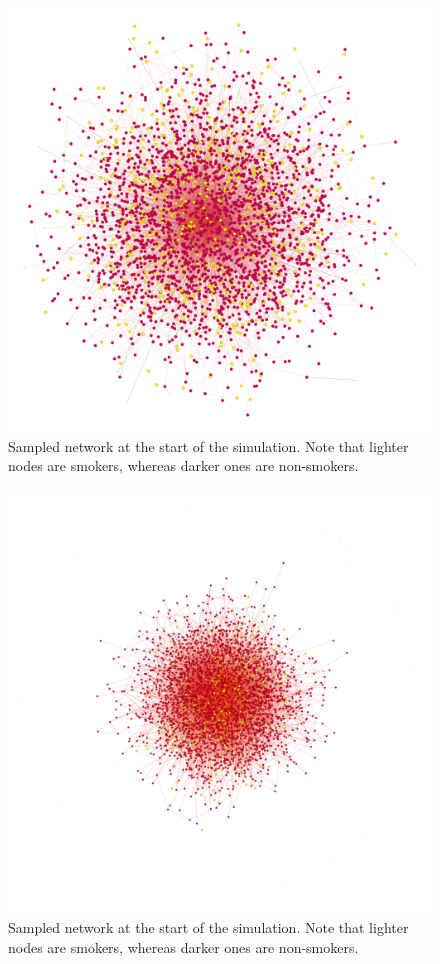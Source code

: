 \documentclass[]{report}
\begin{document}
\begin{figure}
\label{img:sample-init}
\begin{center}
\includegraphics[scale=0.4]{sample-init.png}
\end{center}
\caption{Sampled network at the start of the simulation. Note that lighter nodes are smokers, whereas darker ones are non-smokers.}
\end{figure}
\begin{figure}
\label{img:sample-fin}
\begin{center}
\includegraphics[scale=0.5]{sample-fin.png}
\end{center}
\caption{Sampled network at the start of the simulation. Note that lighter nodes are smokers, whereas darker ones are non-smokers.}
\end{figure}
\end{document}
